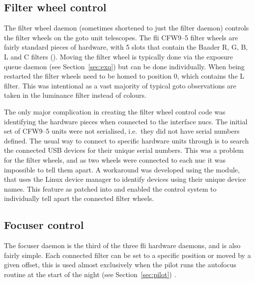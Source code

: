 \begin{colsection}
\begin{colsection}
\end{colsection}


\subsection{Filter wheel control}
\label{sec:filt}
\begin{colsection}

The filter wheel daemon (sometimes shortened to just the filter daemon) controls the filter wheels on the \gls{goto} unit telescopes. The \gls{fli} CFW9--5 filter wheels are fairly standard pieces of hardware, with 5 slots that contain the Baader R, G, B, L and C filters (). Moving the filter wheel is typically done via the exposure queue daemon (see Section~\ref{sec:exq}) but can be done individually. When being restarted the filter wheels need to be homed to position 0, which contains the L filter. This was intentional as a vast majority of typical \gls{goto} observations are taken in the luminance filter instead of colours.

The only major complication in creating the filter wheel control code was identifying the hardware pieces when connected to the interface \glspl{nuc}. The initial set of CFW9--5 units were not serialised, i.e.\ they did not have serial numbers defined. The usual way to connect to specific hardware units through  is to search the connected USB devices for their unique serial numbers. This was a problem for the filter wheels, and as two wheels were connected to each \gls{nuc} it was impossible to tell them apart. A workaround was developed using the   module, that uses the Linux  device manager to identify devices using their unique device names. This feature as patched into  and enabled the control system to individually tell apart the connected filter wheels.

\end{colsection}


\subsection{Focuser control}
\label{sec:foc}
\begin{colsection}

The focuser daemon is the third of the three \gls{fli} hardware daemons, and is also fairly simple. Each connected filter can be set to a specific position or moved by a given offset, this is used almost exclusively when the pilot runs the autofocus routine at the start of the night (see Section~\ref{sec:pilot}) .


\end{colsection}
\end{colsection}
